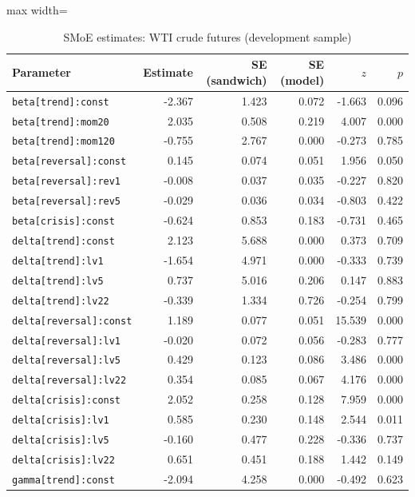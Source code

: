 \begin{table}[!htbp]\centering\scriptsize
\caption{SMoE estimates: WTI crude futures (development sample)}\label{tab:params_cl_fut}
\begin{adjustbox}{max width=\textwidth}
\begin{tabular}{lrrrrr}
\toprule
Parameter & Estimate & SE (sandwich) & SE (model) & $z$ & $p$\\
\midrule
\texttt{beta[trend]:const} & -2.367 & 1.423 & 0.072 & -1.663 & 0.096\\
\texttt{beta[trend]:mom20} & 2.035 & 0.508 & 0.219 & 4.007 & 0.000\\
\texttt{beta[trend]:mom120} & -0.755 & 2.767 & 0.000 & -0.273 & 0.785\\
\texttt{beta[reversal]:const} & 0.145 & 0.074 & 0.051 & 1.956 & 0.050\\
\texttt{beta[reversal]:rev1} & -0.008 & 0.037 & 0.035 & -0.227 & 0.820\\
\texttt{beta[reversal]:rev5} & -0.029 & 0.036 & 0.034 & -0.803 & 0.422\\
\texttt{beta[crisis]:const} & -0.624 & 0.853 & 0.183 & -0.731 & 0.465\\
\texttt{delta[trend]:const} & 2.123 & 5.688 & 0.000 & 0.373 & 0.709\\
\texttt{delta[trend]:lv1} & -1.654 & 4.971 & 0.000 & -0.333 & 0.739\\
\texttt{delta[trend]:lv5} & 0.737 & 5.016 & 0.206 & 0.147 & 0.883\\
\texttt{delta[trend]:lv22} & -0.339 & 1.334 & 0.726 & -0.254 & 0.799\\
\texttt{delta[reversal]:const} & 1.189 & 0.077 & 0.051 & 15.539 & 0.000\\
\texttt{delta[reversal]:lv1} & -0.020 & 0.072 & 0.056 & -0.283 & 0.777\\
\texttt{delta[reversal]:lv5} & 0.429 & 0.123 & 0.086 & 3.486 & 0.000\\
\texttt{delta[reversal]:lv22} & 0.354 & 0.085 & 0.067 & 4.176 & 0.000\\
\texttt{delta[crisis]:const} & 2.052 & 0.258 & 0.128 & 7.959 & 0.000\\
\texttt{delta[crisis]:lv1} & 0.585 & 0.230 & 0.148 & 2.544 & 0.011\\
\texttt{delta[crisis]:lv5} & -0.160 & 0.477 & 0.228 & -0.336 & 0.737\\
\texttt{delta[crisis]:lv22} & 0.651 & 0.451 & 0.188 & 1.442 & 0.149\\
\texttt{gamma[trend]:const} & -2.094 & 4.258 & 0.000 & -0.492 & 0.623\\

\end{tabular}
\end{adjustbox}
\end{table}
